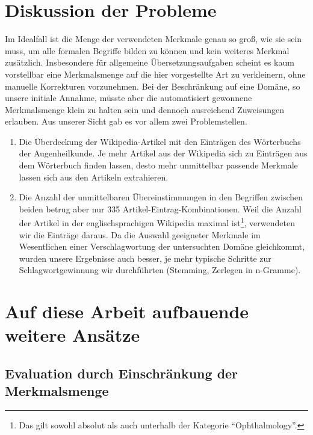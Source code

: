 \documentclass[pagesize,paper=A4,DIV=calc,fontsize=12pt,draft=false]{scrreprt}
\begin{document}

\section{Diskussion der Probleme}

Im Idealfall ist die Menge der verwendeten Merkmale genau so groß, wie sie sein muss, um alle formalen Begriffe bilden zu können und kein weiteres Merkmal zusätzlich. 
Insbesondere für allgemeine Übersetzungsaufgaben scheint es kaum vorstellbar eine Merkmalsmenge auf die hier vorgestellte Art zu verkleinern, ohne manuelle Korrekturen vorzunehmen. 
Bei der Beschränkung auf eine Domäne, so unsere initiale Annahme, müsste aber die automatisiert gewonnene Merkmalsmenge klein zu halten sein und dennoch ausreichend Zuweisungen erlauben. 
Aus unserer Sicht gab es vor allem zwei Problemstellen. 
\begin{enumerate}
\item Die Überdeckung der Wikipedia-Artikel mit den Einträgen des Wörterbuchs der Augenheilkunde. 
Je mehr Artikel aus der Wikipedia sich zu Einträgen aus dem Wörterbuch finden lassen, desto mehr unmittelbar passende Merkmale lassen sich aus den Artikeln extrahieren. 
\item Die Anzahl der unmittelbaren Übereinstimmungen in den Begriffen zwischen beiden betrug aber nur 335 Artikel-Eintrag-Kombinationen. 
Weil die Anzahl der Artikel in der englischsprachigen Wikipedia maximal ist\footnote{Das gilt sowohl absolut als auch unterhalb der Kategorie \enquote{Ophthalmology}.}, verwendeten wir die Einträge daraus. 
Da die Auswahl geeigneter Merkmale im Wesentlichen einer Verschlagwortung der untersuchten Domäne gleichkommt, wurden unsere Ergebnisse auch besser, je mehr typische Schritte zur Schlagwortgewinnung wir durchführten (Stemming, Zerlegen in n-Gramme). 
\end{enumerate}

\section{Auf diese Arbeit aufbauende weitere Ansätze}
\subsection{Evaluation durch Einschränkung der Merkmalsmenge}
\end{document}
